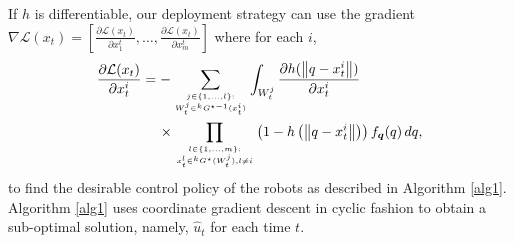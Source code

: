 \documentclass[letterpaper, 10 pt, conference]{ieeeconf}
\DeclareMathOperator*{\argmin}{arg\,min}
\begin{document}
If $h$ is differentiable, our deployment strategy can use the gradient $\nabla  \mathcal{L}(x_t)=\left[\frac{\partial\mathcal{L}(x_t)}{\partial x_1^t},\dots,\frac{\partial\mathcal{L}(x_t)}{\partial x_m^t}\right]$ where for each $i$,
\begin{align*}
\frac{\partial\mathcal{L}(x_t)}{\partial x_t^i} 
&= -\sum_{j \in \lbrace 1,\dots,l \rbrace: \atop W_t^j \in {}^kG^{\star-1}(x_t^i)} \int_{W_t^j}
\frac{\partial h(\left\| q-x_t^i \right\|)}{\partial x_t^i} \\
&\,\,\,\,\,\,\, \times \prod_{l \in \lbrace 1,\dots,m \rbrace: \atop x_{t}^l \in {}^kG^{\star}(W_t^j),l\neq i} \left(1- h \left(\left\|
q - x_t^i \right\|  \right) \right){f}_{\bm{q}}(q)\,dq,
\end{align*}
to find the desirable control policy of the robots as described in Algorithm \ref{alg1}. Algorithm \ref{alg1} uses coordinate gradient descent in cyclic fashion to obtain a sub-optimal solution, namely, $\hat{u}_t$ for each time $t$.
\end{document}
